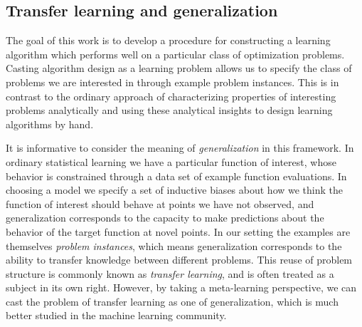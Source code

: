 \documentclass{article}
\begin{document}



\subsection{Transfer learning and generalization}

The goal of this work is to develop a procedure for constructing a learning
algorithm which performs well on a particular class of optimization problems.
Casting algorithm design as a learning problem allows us to specify the class
of problems we are interested in through example problem instances.  This is in
contrast to the ordinary approach of characterizing properties of interesting
problems analytically and using these analytical insights to design learning
algorithms by hand.

It is informative to consider the meaning of \emph{generalization} in this
framework.  In ordinary statistical learning we have a particular function of
interest, whose behavior is constrained through a data set of example function
evaluations.  In choosing a model we specify a set of inductive biases about
how we think the function of interest should behave at points we have not
observed, and generalization corresponds to the capacity to make predictions
about the behavior of the target function at novel points.
In our setting the examples are themselves \emph{problem instances}, which
means generalization corresponds to the ability to transfer knowledge between
different problems.  This reuse of problem structure is commonly known as
\emph{transfer learning}, and is often treated as a subject in its own right.
However, by taking a meta-learning perspective, we can cast the problem of
transfer learning as one of generalization, which is much better studied in the
machine learning community.
\end{document}
